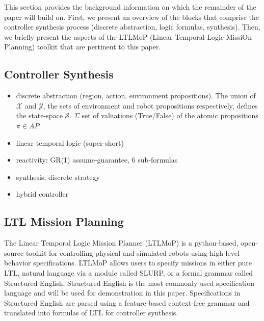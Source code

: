 This section provides the background information on which the remainder of the paper will build on. First, we present an overview of the blocks that comprise the controller synthesis process (discrete abstraction, logic formulas, synthesis). Then, we briefly present the aspects of the LTLMoP (Linear Temporal Logic MissiOn Planning) toolkit that are pertinent to this paper.

\subsection{Controller Synthesis}

\begin{itemize}
	\item discrete abstraction (region, action, environment propositions). The union of $\mathcal{X}$ and $\mathcal{Y}$, the sets of environment and robot propositions respectively, defines the state-space $\mathcal{S}$. $\Sigma$ set of valuations (True/False) of the atomic propositions $\pi \in AP$.
	\item linear temporal logic (super-short)
	\item reactivity: GR(1) assume-guarantee, 6 sub-formulas
	\item synthesis, discrete strategy
	\item hybrid controller
\end{itemize}

\subsection{LTL Mission Planning}

The Linear Temporal Logic Mission Planner (LTLMoP) \cite{Finucane2010} is a python-based, open-source toolkit for controlling physical and simulated robots using high-level behavior specifications. LTLMoP allows users to specify missions in either pure LTL, natural language via a module called SLURP, or a formal grammar called Structured English. Structured English is the most commonly used specification language and will be used for demonstration in this paper. Specifications in Structured English are parsed using a feature-based context-free grammar and translated into formulas of LTL for controller synthesis. 